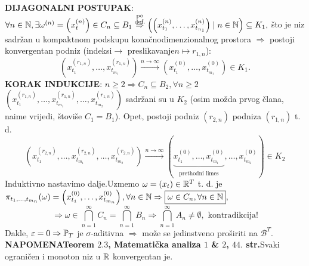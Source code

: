 \documentclass{article}
\begin{document}
\textbf{DIJAGONALNI POSTUPAK}:\newline \(\forall n\in\Bbb N,\exists\omega^{(n)}=\left(x_t^{(n)}\right)\in C_n\subseteq B_1\overset{\substack{\text{po}\\\text{def.}}}{\Rightarrow} \left(\left(x_{t_1}^{(n)},\ldots,x_{t_{n_1}}^{(n)}\right)\mid n\in\Bbb N\right)\subseteq K_1,\) što je niz sadržan u kompaktnom podskupu konačnodimenzionalnog prostora \(\Rightarrow\) postoji konvergentan podniz (indeksi\(\to\) preslikavanje\newline \(n\mapsto r_{1,n}\)): \[\left(x_{t_1}^{(r_{1,n})},\ldots,x_{t_{m_1}}^{(r_{1,n})}\right)\overset{n\to\infty}{\longrightarrow}\left(x_{t_1}^{(0)},\ldots,x_{t_{m_1}}^{(0)}\right)\in K_1.\] \textbf{KORAK INDUKCIJE}: \(n\ge 2\Rightarrow C_n\subseteq B_2,\forall n\ge 2\)\newline \(\left(x_{t_1}^{(r_{1,n})},\ldots,x_{t_{m_1}}^{(r_{1,n})},\ldots,x_{t_{m_2}}^{(r_{1,n})}\right)\) sadržani su u \(K_2\) (osim možda prvog člana, naime vrijedi, štoviše \(C_1=B_1\)). Opet, postoji podniz \((r_{2,n})\) podniza \((r_{1,n})\) t. d. \[\left(x_{t_1}^{(r_{2,n})},\ldots,x_{t_{m_1}}^{(r_{2,n})},\ldots,x_{t_{m_2}}^{(r_{2,n})}\right)\overset{n\to\infty}{\longrightarrow}\left(\underbrace{x_{t_1}^{(0)},\ldots,x_{t_{m_1}}^{(0)}}_{\substack{\text{prethodni limes}}},\ldots,x_{t_{m_2}}^{(0)}\right)\in K_2\] Induktivno nastavimo dalje.\newline Uzmemo \(\omega=(x_t)\in\Bbb R^T\) t. d. je \(\pi_{t_1,\ldots,t_{m_n}}(\omega)=\left(x_{t_1}^{(0)},\ldots,x_{t_{m_n}}^{(0)}\right),\forall n\in\Bbb N\Rightarrow \boxed{\omega\in C_n,\forall n\in\Bbb N},\) \[\Rightarrow\omega\in\bigcap_{n=1}^\infty C_n=\bigcap_{n=1}^\infty B_n\Rightarrow\bigcap_{n=1}^\infty A_n\ne\emptyset,\text{ kontradikcija!}\] Dakle, \(\varepsilon=0\Rightarrow\Bbb P_T\) je \(\sigma\)-aditivna \(\Rightarrow\) može se jedinstveno proširiti na \(\mathcal B^T.\) \newline{}\textbf{NAPOMENA}\newline \textbf{Teorem \(2.3\), Matematička analiza \(1\) \& \(2\), \(44.\) str.}\newline Svaki ograničen i monoton niz u \(\Bbb R\) konvergentan je.\newpage
\end{document}
